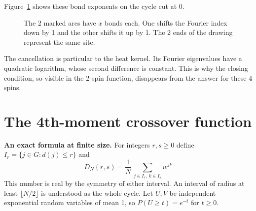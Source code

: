 \documentclass[11pt,a4paper]{article}
\theoremstyle{remark}
\begin{document}
Figure~\ref{fig:arcs} shows these bond exponents on the cycle cut at 0.

\begin{figure}[htb!]
\centering
{}
\caption{The 2 marked arcs have $x$ bonds each. One shifts the Fourier
index down by 1 and the other shifts it up by 1. The 2 ends of the
drawing represent the same site.}\label{fig:arcs}
\end{figure}

The cancellation is particular to the heat kernel. Its Fourier eigenvalues
have a quadratic logarithm, whose second difference is constant. This is
why the closing condition, so visible in the 2-spin function, disappears
from the answer for these 4 spins.

\section{The 4th-moment crossover function}\label{sec:cross}\label{sec:limits}

\medskip

\noindent\textbf{An exact formula at finite size.} 
For integers $r,s\ge0$ define $I_r=\{j\in G:d(j)\le r\}$ and
\[
 D_N(r,s)=\frac1N\,\sum_{j\in I_r,\ k\in I_s} w^{jk}
\]
This number is real by the symmetry of either interval. An interval
of radius at least $\lfloor N/2\rfloor$ is understood as the whole cycle.
Let $U,V$ be independent exponential random variables of mean 1, so
$P(U\ge t)=e^{-t}$ for $t\ge0$.
\end{document}
